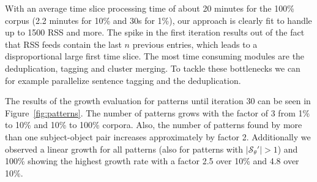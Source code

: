 \documentclass[a4paper]{llncs}
\begin{document}
With an average time slice processing time of about 20 minutes for the 100\% corpus (2.2 minutes for 10\% and 30s for 1\%), our approach is clearly fit to handle up to 1500 RSS and more.
The spike in the first iteration results out of the fact that RSS feeds contain the last $n$ previous entries, which leads to a disproportional large first time slice.
The most time consuming modules are the deduplication, tagging and cluster merging.
To tackle these bottlenecks we can for example parallelize sentence tagging and the deduplication.

The results of the growth evaluation for patterns until iteration 30 can be seen in Figure~\ref{fig:patterns}.
The number of patterns grows with the factor of 3 from 1\% to 10\% and 10\% to 100\% corpora.
Also, the number of patterns found by more than one subject-object pair increases approximately by factor 2.
Additionally we observed a linear growth for all patterns (also for patterns with $|\mathcal{S}_\theta'| > 1$) and 100\% showing the highest growth rate with a factor 2.5 over 10\% and 4.8 over 10\%.
\end{document}
